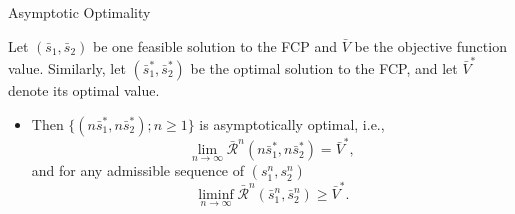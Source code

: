 \documentclass[smaller ,table,usenames,dvipsnames]{beamer}
\newcommand{\?}{\stackrel{?}{=}}
\begin{document}
\begin{frame}{Asymptotic Optimality}
	\begin{theorem}\label{thm:asym_optimality}
	Let $ (\bar{s}_1, \bar{s}_2) $ be one feasible solution to the FCP and $\bar{V}$ be the objective function value. Similarly, let $ (\bar{s}_1^*, \bar{s}_2^*) $ be the optimal solution to the FCP, and let $ \bar{V}^* $ denote its optimal value. 		
	\begin{itemize}
		\item []	Then $ \{ (n\bar{s}^*_1, n\bar{s}^*_2);n\geq 1 \}$ is asymptotically optimal, i.e.,	\begin{equation}\label{thm:ao_part1}
		\lim_{n\rightarrow\infty} \bar{\mathcal{R}}^n(n\bar{s}^*_1, n\bar{s}^*_2) = \bar{V}^*,
		\end{equation} and for any admissible sequence of $ (s_1^n, s_2^n) $
		\begin{equation}\label{thm:ao_part2}
		\liminf_{n\rightarrow\infty} \bar{\mathcal{R}}^n(\bar{s}_1^n, \bar{s}_2^n) \geq \bar{V}^*.
		\end{equation}			
	\end{itemize}	
\end{theorem}
\end{frame}
\end{document}
